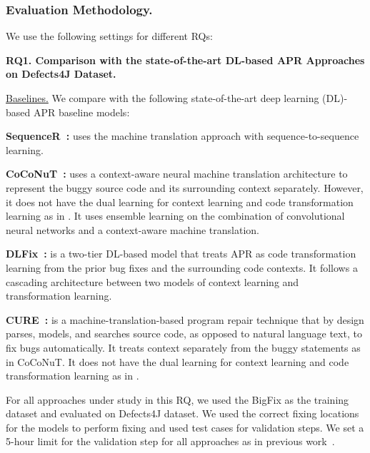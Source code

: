 \subsubsection{Evaluation Methodology.}
We use the following settings for different RQs:

{\bf RQ1. Comparison with the state-of-the-art DL-based APR Approaches on
  Defects4J Dataset.}

\underline{Baselines.} We compare {\tool} with the following
state-of-the-art deep learning (DL)-based APR baseline models:



{\bf SequenceR~\cite{chen2018sequencer}: } uses the machine
translation approach with sequence-to-sequence learning.

{\bf CoCoNuT~\cite{lutellier2020coconut}:} uses a context-aware neural
machine translation architecture to represent the buggy source code
and its surrounding context separately. However, it does not have the
dual learning for context learning and code transformation learning as
in {\tool}. It uses ensemble learning on the combination of
convolutional neural networks and a context-aware machine translation.

{\bf DLFix~\cite{icse20}: } is a two-tier DL-based model that
treats APR as code transformation learning from the prior bug fixes
and the surrounding code contexts. It follows a cascading architecture
between two models of context learning and transformation learning.

{\bf CURE~\cite{cure-icse21}: } is a machine-translation-based program repair
technique that by design parses, models, and searches source code, as
opposed to natural language text, to fix bugs automatically. It treats
context separately from the buggy statements as in CoCoNuT. It does
not have the dual learning for context learning and code
transformation learning as in {\tool}.



For all approaches under study in this RQ, we used the BigFix as the
training dataset and evaluated on Defects4J dataset. 
We used the correct fixing locations for the models to perform fixing
and used test cases for validation steps.  We set a 5-hour limit for
the validation step for all approaches as in previous
work~\cite{icse20,tbar-issta19}.


